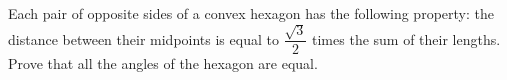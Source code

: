 Each pair of opposite sides of a convex hexagon has the following property: the distance between their midpoints is equal to  $\dfrac{\sqrt{3}}{2}$ times the sum of their lengths. Prove that all the angles of the hexagon are equal.